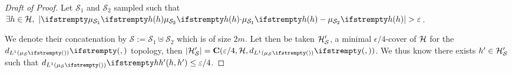 \begin{proof}[Draft of Proof]
	Let $\mathcal{S}_1$ and $\mathcal{S}_2$ sampled such that $\exists \threequery \in \threeqset,\ \dnude{\nu}{\empdistr{\mathcal{S}_1}{\threequery}}{\empdistr{\mathcal{S}_2}{\threequery}} > \epsilon$. 
	
	We denote their concatenation by $\mathcal{S} := \mathcal{S}_1 \uplus \mathcal{S}_2$ which is of size $2m$. Let then be taken $\mathcal{H}'_{\mathcal{S}}$, a minimal $\epsilon/4$-cover of $\mathcal{H}$ for the $\dlone{\empdistr{\mathcal{S}}{}}{}{}$ topology, then $|\threeqset'_{\mathcal{S}}| = \covering(\epsilon/4, \threeqset, \dlone{\empdistr{\mathcal{S}}{}}{}{})$. We thus know there exists $h' \in \mathcal{H}'_{\mathcal{S}}$ such that $\dlone{\empdistr{\mathcal{S}}{}}{\threequery}{\threequery'} \leq \epsilon/4$.



\end{proof}
